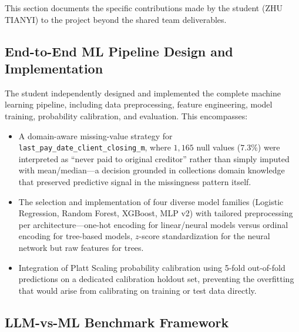 \documentclass[12pt, a4paper]{article}
\begin{document}
This section documents the specific contributions made by the student (ZHU TIANYI) to the project beyond the shared team deliverables.

\subsection{End-to-End ML Pipeline Design and Implementation}

The student independently designed and implemented the complete machine learning pipeline, including data preprocessing, feature engineering, model training, probability calibration, and evaluation. This encompasses:
\begin{itemize}[leftmargin=*]
    \item A domain-aware missing-value strategy for \texttt{last\_pay\_date\_client\_closing\_m}, where $1{,}165$ null values ($7.3\%$) were interpreted as ``never paid to original creditor'' rather than simply imputed with mean/median---a decision grounded in collections domain knowledge that preserved predictive signal in the missingness pattern itself.
    
    \item The selection and implementation of four diverse model families (Logistic Regression, Random Forest, XGBoost, MLP v2) with tailored preprocessing per architecture---one-hot encoding for linear/neural models versus ordinal encoding for tree-based models, $z$-score standardization for the neural network but raw features for trees.
    
    \item Integration of Platt Scaling probability calibration using 5-fold out-of-fold predictions on a dedicated calibration holdout set, preventing the overfitting that would arise from calibrating on training or test data directly.
\end{itemize}

\subsection{LLM-vs-ML Benchmark Framework}
\end{document}
